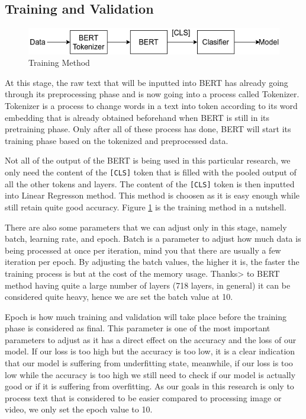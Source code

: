 \subsection{Training and Validation}

\begin{figure}[h!]
    \begin{center}
        \includegraphics[width= 0.9\linewidth]{gambar/training.png}
        \caption{Training Method}
        \label{fig: metodologi_training}
    \end{center}
\end{figure}

At this stage, the raw text that will be inputted into BERT has already going through its preprocessing phase and is now going into a process called Tokenizer. Tokenizer is a process to change words in a text into token according to its word embedding that is already obtained beforehand when BERT is still in its pretraining phase. Only after all of these process has done, BERT will start its training phase based on the tokenized and preprocessed data.

Not all of the output of the BERT is being used in this particular research, we only need the content of the \texttt{[CLS]} token that is filled with the pooled output of all the other tokens and layers. The content of the \texttt{[CLS]} token is then inputted into Linear Regresson method. This method is choosen as it is easy enough while still retain quite good accuracy. Figure \ref{fig: metodologi_training} is the training method in a nutshell.

There are also some parameters that we can adjust only in this stage, namely batch, learning rate, and epoch. Batch is a parameter to adjust how much data is being processed at once per iteration, mind you that there are usually a few iteration per epoch. By adjusting the batch values, the higher it is, the faster the training process is but at the cost of the memory usage. Thanks> to BERT method having quite a large number of layers (718 layers, in general) it can be considered quite heavy, hence we are set the batch value at 10.

Epoch is how much training and validation will take place before the training phase is considered as final. This parameter is one of the most important parameters to adjust as it has a direct effect on the accuracy and the loss of our model. If our loss is too high but the accuracy is too low, it is a clear indication that our model is suffering from underfitting state, meanwhile, if our loss is too low while the accuracy is too high we still need to check if our model is actually good or if it is suffering from overfitting. As our goals in this research is only to process text that is considered to be easier compared to processing image or video, we only set the epoch value to 10.

